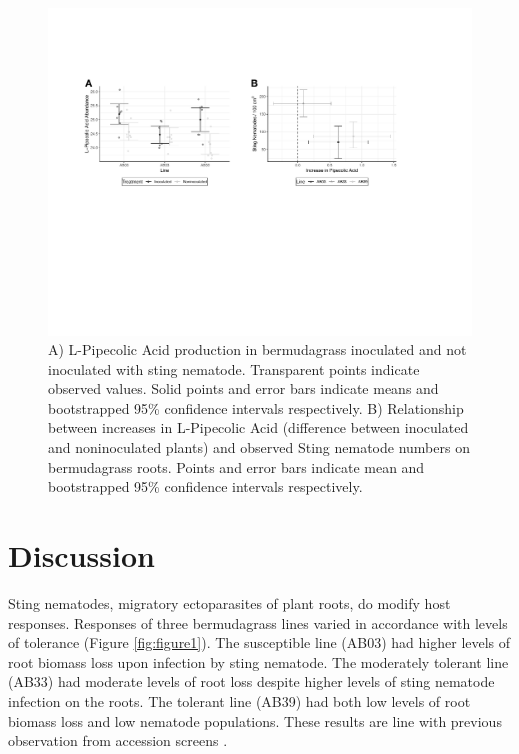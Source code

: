 \documentclass[fleqn,10pt]{wlscirep}
\begin{document}
\begin{figure}
\includegraphics[width = 0.95\linewidth]{figures/publication_figures/figure-6.pdf}
\caption{A) L-Pipecolic Acid production in bermudagrass inoculated and not inoculated with sting nematode.  Transparent points indicate observed values.  Solid points and error bars indicate means and bootstrapped 95\% confidence intervals respectively.  B) Relationship between increases in L-Pipecolic Acid (difference between inoculated and noninoculated plants) and observed Sting nematode numbers on bermudagrass roots.  Points and error bars indicate mean and bootstrapped 95\% confidence intervals respectively.   }
\label{fig:figure6}
\end{figure}


\section*{Discussion}

Sting nematodes, migratory ectoparasites of plant roots, do modify host responses. Responses of three bermudagrass lines varied in accordance with levels of tolerance (Figure \ref{fig:figure1}).  The susceptible line (AB03) had higher levels of root biomass loss upon infection by sting nematode.  The moderately tolerant line (AB33) had moderate levels of root loss despite higher levels of sting nematode infection on the roots.  The tolerant line (AB39) had both low levels of root biomass loss and low nematode populations.  These results are line with previous observation from accession screens \cite{pang2011bermudagrass, pang2011screening}.
\end{document}
